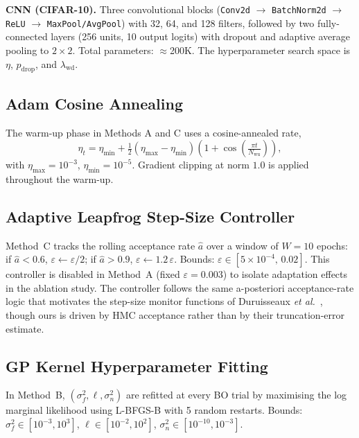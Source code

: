 \documentclass[11pt]{article}
\theoremstyle{definition}
\begin{document}
\textbf{CNN (CIFAR-10).}
Three convolutional blocks (\texttt{Conv2d} $\to$ \texttt{BatchNorm2d}
$\to$ \texttt{ReLU} $\to$ \texttt{MaxPool/AvgPool}) with 32, 64, and
128 filters, followed by two fully-connected layers (256 units, 10
output logits) with dropout and adaptive average pooling to $2\times2$.
Total parameters: $\approx$200K. The hyperparameter search space is
$\eta$, $p_{\mathrm{drop}}$, and $\lambda_{\mathrm{wd}}$.

\subsection{Adam Cosine Annealing}

The warm-up phase in Methods A and C uses a cosine-annealed rate,
\begin{equation}
\eta_t = \eta_{\min}
  + \tfrac{1}{2}(\eta_{\max}-\eta_{\min})
    \!\left(1+\cos\!\left(\tfrac{\pi t}{N_{\mathrm{wu}}}\right)\right),
\label{eq:cosine}
\end{equation}
with $\eta_{\max}=10^{-3}$, $\eta_{\min}=10^{-5}$.
Gradient clipping at norm $1.0$ is applied throughout the warm-up.

\subsection{Adaptive Leapfrog Step-Size Controller}

Method~C tracks the rolling acceptance rate $\hat{a}$ over a window
of $W=10$ epochs: if $\hat{a}<0.6$, $\varepsilon\leftarrow\varepsilon/2$;
if $\hat{a}>0.9$, $\varepsilon\leftarrow1.2\,\varepsilon$. Bounds:
$\varepsilon\in[5\times10^{-4},\,0.02]$. This controller is disabled
in Method~A (fixed $\varepsilon=0.003$) to isolate adaptation effects
in the ablation study. The controller follows the same a-posteriori
acceptance-rate logic that motivates the step-size monitor functions
of Duruisseaux \emph{et al.}~\cite{duruisseaux2021adaptive}, though
ours is driven by HMC acceptance rather than by their truncation-error
estimate.

\subsection{GP Kernel Hyperparameter Fitting}

In Method~B, $(\sigma_f^2,\ell,\sigma_n^2)$ are refitted at every BO
trial by maximising the log marginal likelihood using L-BFGS-B with
5 random restarts. Bounds: $\sigma_f^2\in[10^{-3},10^3]$,
$\ell\in[10^{-2},10^2]$, $\sigma_n^2\in[10^{-10},10^{-3}]$.
\end{document}
